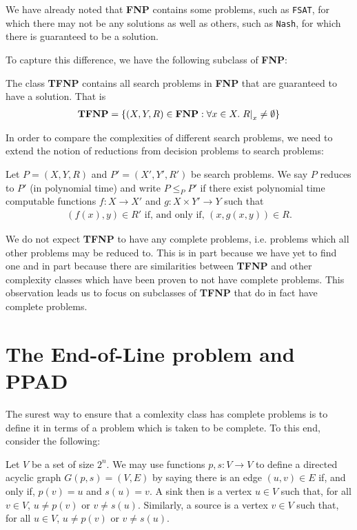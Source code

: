 \documentclass{article}
\begin{document}
We have already noted that \textbf{FNP} contains some problems,
such as \texttt{FSAT}, for which there may not be any solutions
as well as others, such as \texttt{Nash}, for which there is
guaranteed to be a solution.

To capture this difference, we have the following subclass
of \textbf{FNP}:

\begin{definition}
  The class \textbf{TFNP} contains all search problems in \textbf{FNP}
  that are guaranteed to have a solution. That is
  \begin{align*}
    \textbf{TFNP} = \left\lbrace{(X,Y,R) \in \textbf{FNP} : \forall x\in X. \left.{R}\right\vert_{x}\neq\emptyset}\right\rbrace
  \end{align*}
\end{definition}

In order to compare the complexities of different search problems,
we need to extend the notion of reductions from decision problems to
search problems:

\begin{definition}
  Let $P=(X,Y,R)$ and $P'=(X',Y',R')$ be search problems. We say
  $P$ reduces to $P'$ (in polynomial time) and write $P\leq_P P'$
  if there exist polynomial time computable functions $f:X\to X'$ and
  $g:X\times Y'\to Y$ such that
  \begin{align*}
    (f(x),y)\in R' \text{ if, and only if, } (x,g(x,y))\in R.
  \end{align*}
\end{definition}

We do not expect \textbf{TFNP} to have any complete problems, i.e.
problems which all other problems may be reduced to. This is in part
because we have yet to find one and in part because there are similarities
between \textbf{TFNP} and other complexity classes which have been
proven to not have complete problems. \cite{goldberg2017}
This observation leads us to focus on subclasses of \textbf{TFNP} that
do in fact have complete problems.

\section{The End-of-Line problem and PPAD}

The surest way to ensure that a comlexity class has complete problems
is to define it in terms of a problem which is taken to be complete.
To this end, consider the following:

Let $V$ be a set of size $2^n$. We may use functions
$p,s:V\to V$ to define a directed acyclic graph $G(p,s)=(V,E)$ by
saying there is an edge $(u,v)\in E$ if, and only if, $p(v)=u$
and $s(u)=v$. A sink then is a vertex $u\in V$ such that,
for all $v\in V$, $u\neq p(v)$ or $v\neq s(u)$. Similarly,
a source is a vertex $v\in V$ such that, for all $u\in V$,
$u\neq p(v)$ or $v\neq s(u)$.
\end{document}
